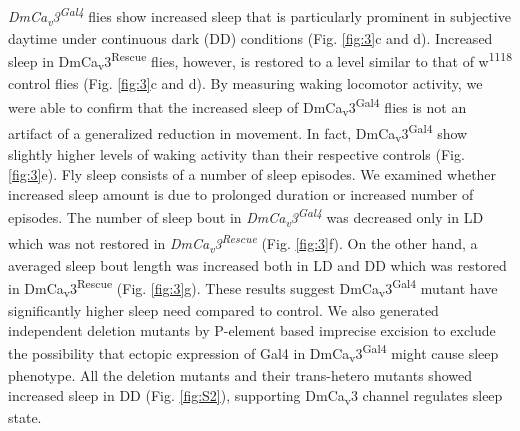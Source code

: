\emph{DmCa\textsubscript{v}3\textsuperscript{Gal4}} flies show increased sleep that is particularly prominent in subjective daytime under continuous dark (DD) conditions (Fig. \ref{fig:3}c and d).
Increased sleep in DmCa\textsubscript{v}3\textsuperscript{Rescue} flies, however, is restored to a level similar to that of w\textsuperscript{1118} control flies (Fig. \ref{fig:3}c and d).
By measuring waking locomotor activity, we were able to confirm that the increased sleep of DmCa\textsubscript{v}3\textsuperscript{Gal4} flies is not an artifact of a generalized reduction in movement. In fact, DmCa\textsubscript{v}3\textsuperscript{Gal4} show slightly higher levels of waking activity than their respective controls (Fig. \ref{fig:3}e).
Fly sleep consists of a number of sleep episodes.
We examined whether increased sleep amount is due to prolonged duration or increased number of episodes.
The number of sleep bout in \emph{DmCa\textsubscript{v}3\textsuperscript{Gal4}} was decreased only in LD which was not restored in \emph{DmCa\textsubscript{v}3\textsuperscript{Rescue}} (Fig. \ref{fig:3}f).
On the other hand, a averaged sleep bout length was increased both in LD and DD which was restored in DmCa\textsubscript{v}3\textsuperscript{Rescue} (Fig. \ref{fig:3}g).
These results suggest DmCa\textsubscript{v}3\textsuperscript{Gal4} mutant have significantly higher sleep need compared to control.
We also generated independent deletion mutants by P-element based imprecise excision to exclude the possibility that ectopic expression of Gal4 in DmCa\textsubscript{v}3\textsuperscript{Gal4} might cause sleep phenotype.
All the deletion mutants and their trans-hetero mutants showed increased sleep in DD (Fig. \ref{fig:S2}), supporting DmCa\textsubscript{v}3 channel regulates sleep state.
    
  